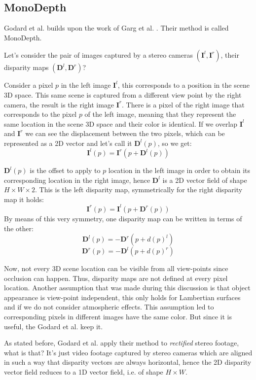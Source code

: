 \subsection{MonoDepth}
Godard et al. \cite{MonoDepth} builds upon the work of Garg et al. \cite{Garg}.
Their method is called MonoDepth.

Let's consider the pair of images captured by a stereo cameras $(\mathbf{I}^{l}, \mathbf{I}^{r})$, their disparity maps $(\mathbf{D}^{l}, \mathbf{D}^{r})$?

Consider a pixel $p$ in the left image $\mathbf{I}^{l}$, this corresponds to a position in the scene 3D space.
This same scene is captured from a different view point by the right camera, the result is the right image $\mathbf{I}^{r}$.
There is a pixel of the right image that corresponds to the pixel $p$ of the left image, meaning that they represent the same location in the scene 3D space and their color is identical.
If we overlap $\mathbf{I}^{l}$ and $\mathbf{I}^{r}$ we can see the displacement between the two pixels, which can be represented as a 2D vector and let's call it $\mathbf{D}^{l}(p)$, so we get:
\[
	\mathbf{I}^{l}(p) = \mathbf{I}^{r}(p + \mathbf{D}^{l}(p))
\]

$\mathbf{D}^{l}(p)$ is the offset to apply to $p$ location in the left image in order to obtain its corresponding location in the right image, hence $\mathbf{D}^{l}$ is a 2D vector field of shape $H \times W \times 2$.
This is the left disparity map, symmetrically for the right disparity map it holds:
\[
	\mathbf{I}^{r}(p) = \mathbf{I}^{l}(p + \mathbf{D}^{r}(p))
\]
By means of this very symmetry, one disparity map can be written in terms of the other:
\[
\mathbf{D}^{l}(p) = - \mathbf{D}^{r}(p + d(p)^{l})
\]\[
\mathbf{D}^{r}(p) = - \mathbf{D}^{l}(p + d(p)^{r})
\]

Now, not every 3D scene location can be visible from all view-points since occlusion can happen.
Thus, disparity maps are not defined at every pixel location.
Another assumption that was made during this discussion is that object appearance is view-point independent, this only holds for Lambertian surfaces and if we do not consider atmospheric effects.
This assumption led to corresponding pixels in different images have the same color.
But since it is useful, the Godard et al. keep it.

As stated before, Godard et al. apply their method to \textit{rectified} stereo footage, what is that?
It's just video footage captured by stereo cameras which are aligned in such a way that disparity vectors are always horizontal, hence the 2D disparity vector field reduces to a 1D vector field, i.e. of shape $H \times W$.

